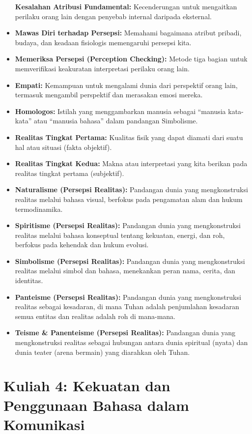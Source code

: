 \documentclass[
  letterpaper,
  DIV=11,
  numbers=noendperiod]{scrreprt}
\begin{document}
\begin{itemize}
  \textbf{Kesalahan Atribusi Fundamental:} Kecenderungan untuk
  mengaitkan perilaku orang lain dengan penyebab internal daripada
  eksternal.
\item
  \textbf{Mawas Diri terhadap Persepsi:} Memahami bagaimana atribut
  pribadi, budaya, dan keadaan fisiologis memengaruhi persepsi kita.
\item
  \textbf{Memeriksa Persepsi (Perception Checking):} Metode tiga bagian
  untuk memverifikasi keakuratan interpretasi perilaku orang lain.
\item
  \textbf{Empati:} Kemampuan untuk mengalami dunia dari perspektif orang
  lain, termasuk mengambil perspektif dan merasakan emosi mereka.
\item
  \textbf{Homologos:} Istilah yang menggambarkan manusia sebagai
  ``manusia kata-kata'' atau ``manusia bahasa'' dalam pandangan
  Simbolisme.
\item
  \textbf{Realitas Tingkat Pertama:} Kualitas fisik yang dapat diamati
  dari suatu hal atau situasi (fakta objektif).
\item
  \textbf{Realitas Tingkat Kedua:} Makna atau interpretasi yang kita
  berikan pada realitas tingkat pertama (subjektif).
\item
  \textbf{Naturalisme (Persepsi Realitas):} Pandangan dunia yang
  mengkonstruksi realitas melalui bahasa visual, berfokus pada
  pengamatan alam dan hukum termodinamika.
\item
  \textbf{Spiritisme (Persepsi Realitas):} Pandangan dunia yang
  mengkonstruksi realitas melalui bahasa konseptual tentang kekuatan,
  energi, dan roh, berfokus pada kehendak dan hukum evolusi.
\item
  \textbf{Simbolisme (Persepsi Realitas):} Pandangan dunia yang
  mengkonstruksi realitas melalui simbol dan bahasa, menekankan peran
  nama, cerita, dan identitas.
\item
  \textbf{Panteisme (Persepsi Realitas):} Pandangan dunia yang
  mengkonstruksi realitas sebagai kesadaran, di mana Tuhan adalah
  penjumlahan kesadaran semua entitas dan realitas adalah roh di
  mana-mana.
\item
  \textbf{Teisme \& Panenteisme (Persepsi Realitas):} Pandangan dunia
  yang mengkonstruksi realitas sebagai hubungan antara dunia spiritual
  (nyata) dan dunia teater (arena bermain) yang diarahkan oleh Tuhan.
\end{itemize}


\chapter{Kuliah 4: Kekuatan dan Penggunaan Bahasa dalam
Komunikasi}\label{kuliah-4-kekuatan-dan-penggunaan-bahasa-dalam-komunikasi}
\end{document}
